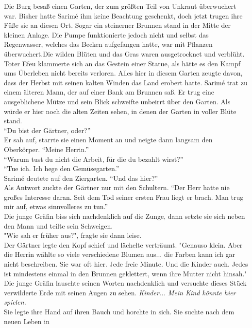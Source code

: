 Die Burg besaß einen Garten, der zum größten Teil von Unkraut überwuchert war. Bisher hatte Sarimé 
ihm keine Beachtung geschenkt, doch jetzt trugen ihre Füße sie an diesen Ort. Sogar ein steinerner 
Brunnen stand in der Mitte der kleinen Anlage. Die Pumpe funktionierte jedoch nicht und selbst das 
Regenwasser, welches das Becken aufgefangen hatte, war mit Pflanzen überwuchert.Die wilden Blüten 
und das Gras waren ausgetrocknet und verblüht. Toter Efeu klammerte sich an das Gestein einer 
Statue, als hätte es den Kampf ums Überleben nicht bereits verloren. Alles hier in diesem Garten 
zeugte davon, dass der Herbst mit seinen kalten Winden das Land erobert hatte. Sarimé trat zu 
einem älteren Mann, der auf einer Bank am Brunnen saß. Er trug eine ausgeblichene Mütze und sein 
Blick schweifte unbeirrt über den Garten. Als würde er hier noch die alten Zeiten sehen, in denen 
der Garten in voller Blüte stand.\\
``Du bist der Gärtner, oder?''\\
Er sah auf, starrte sie einen Moment an und neigte dann langsam den Oberkörper. ``Meine Herrin.''\\
``Warum tust du nicht die Arbeit, für die du bezahlt wirst?''\\
``Tue ich. Ich hege den Gemüsegarten.''\\
Sarimé deutete auf den Ziergarten. ``Und das hier?''\\
Als Antwort zuckte der Gärtner nur mit den Schultern. ``Der Herr hatte nie großes Interesse daran. 
Seit dem Tod seiner ersten Frau liegt er brach. Man trug mir auf, etwas sinnvolleres zu tun.''\\
Die junge Gräfin biss sich nachdenklich auf die Zunge, dann setzte sie sich neben den Mann und 
teilte sein Schweigen. \\
"Wie sah er früher aus?", fragte sie dann leise.\\
Der Gärtner legte den Kopf schief und lächelte verträumt. "Genauso klein. Aber die Herrin wählte so 
viele verschiedene Blumen aus... die Farben kann ich gar nicht beschreiben. Sie war oft hier. Jede 
freie Minute. Und die Kinder auch. Jedes ist mindestens einmal in den Brunnen geklettert, wenn ihre 
Mutter nicht hinsah."\\
Die junge Gräfin lauschte seinen Worten nachdenklich und versuchte dieses Stück verwilderte Erde 
mit seinen Augen zu sehen. \textit{Kinder... Mein Kind könnte hier spielen.}\\
Sie legte ihre Hand auf ihren Bauch und horchte in sich. Sie suchte nach dem neuen Leben in 
